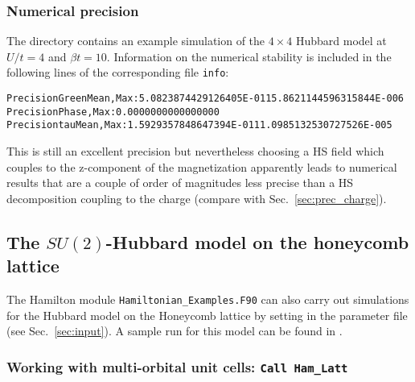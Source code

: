 \subsubsection{Numerical precision}\label{sec:prec_spin}
The directory   contains an example simulation of the $4 \times 4$ Hubbard model at $U/t=4$ and $\beta t = 10$. 
Information on the numerical stability is included in the following lines of the corresponding file \texttt{info}:
 \begin{alltt}
Precision Green  Mean, Max :    5.0823874429126405E-011   5.8621144596315844E-006
Precision Phase, Max       :    0.0000000000000000     
Precision tau    Mean, Max :    1.5929357848647394E-011   1.0985132530727526E-005 
\end{alltt}

This is still an excellent precision but nevertheless choosing a 
 HS field which couples to the z-component of the magnetization apparently leads to numerical results that are 
a couple of order of magnitudes less precise than a HS decomposition coupling to the charge (compare with Sec.~\ref{sec:prec_charge}).

    

\subsection{The $SU(2)$-Hubbard model on  the honeycomb  lattice}\label{sec:walk1.2}

The Hamilton module \texttt{Hamiltonian\_Examples.F90}   can also carry out simulations for the Hubbard model on the Honeycomb lattice by setting in the parameter file    (see Sec.~\ref{sec:input}).
 A sample run for this model can be found in .

\subsubsection{Working with multi-orbital unit cells:  \texttt{Call Ham\_Latt} } \label{sec:multi-orbital}

